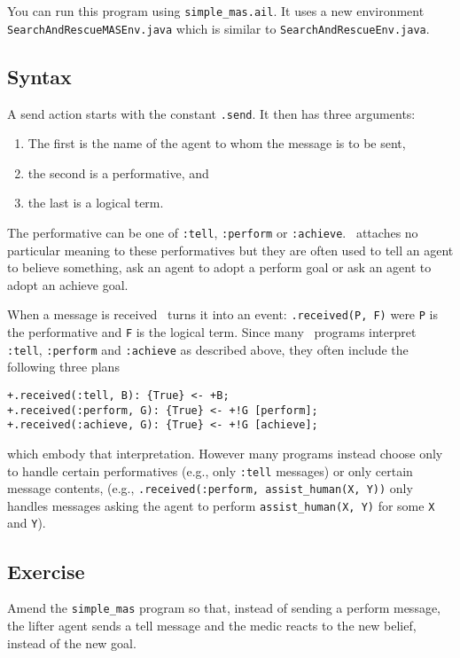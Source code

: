 \documentclass[a4]{article}
\begin{document}
You can run this program using \texttt{simple\_mas.ail}.  It uses a new environment \texttt{SearchAndRescueMASEnv.java} which is similar to \texttt{SearchAndRescueEnv.java}.

\subsection{Syntax}

A send action starts with the constant \texttt{.send}.  It then has three arguments:
\begin{enumerate}
\item The first is the name of the agent to whom the message is to be sent, 
\item the second is a performative, and 
\item the last is a logical term.  
\end{enumerate}
The performative can be one of \texttt{:tell}, \texttt{:perform} or \texttt{:achieve}.  \gwendolen\ attaches no particular meaning to these performatives but they are often used to tell an agent to believe something, ask an agent to adopt a perform goal or ask an agent to adopt an achieve goal.

\begin{sloppypar}
When a message is received \gwendolen\ turns it into an event: \texttt{.received(P,~F)} were \texttt{P} is the performative and \texttt{F} is the logical term.  Since many \gwendolen\ programs interpret \texttt{:tell}, \texttt{:perform} and \texttt{:achieve} as described above, they often include the following three plans 
\end{sloppypar}
\begin{verbatim}
+.received(:tell, B): {True} <- +B;
+.received(:perform, G): {True} <- +!G [perform];
+.received(:achieve, G): {True} <- +!G [achieve];
\end{verbatim}
which embody that interpretation.  However many programs instead choose only to handle certain performatives (e.g., only \texttt{:tell} messages) or only certain message contents, (e.g., \texttt{.received(:perform, assist\_human(X, Y))} only handles messages asking the agent to perform \texttt{assist\_human(X, Y)} for some \texttt{X} and \texttt{Y}).

\subsection{Exercise}
Amend the \texttt{simple\_mas} program so that, instead of sending a perform message, the lifter agent sends a tell message and the medic reacts to the new belief, instead of the new goal.
\end{document}
